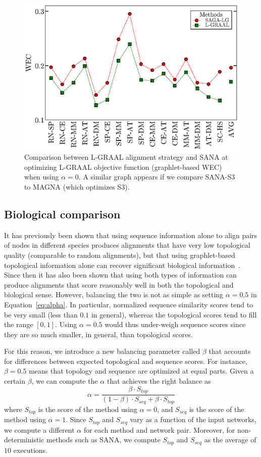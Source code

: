 \documentclass{bioinfo}
\begin{document}
\begin{figure}
\centering
\includegraphics[width=0.99\linewidth]{lgraalobjfuncomparison_bw.eps}
\caption{Comparison between L-GRAAL alignment strategy and SANA at optimizing L-GRAAL objective function (graphlet-based WEC) when using $\alpha=0$. A similar graph appears if we compare SANA-S3 to MAGNA (which optimizes S3).}
\label{fig:lgraalobjfuncomparison}
\end{figure}

\subsection{Biological comparison}\label{bio}

It has previously been shown that using sequence information alone to align pairs of nodes in different species produces alignments that have very low topological quality (comparable to random alignments), but that using graphlet-based topological information alone can recover significant biological information~\citep{GRAAL}. Since then it has also been shown that using both types of information can produce alignments that score reasonably well in both the topological and biological sense. However, balancing the two is not as simple as setting $\alpha=0.5$ in Equation~\ref{eq:alpha}. In particular, normalized sequence similarity scores tend to be very small (less than $0.1$ in general), whereas the topological scores tend to fill the range $[0,1]$. Using $\alpha=0.5$ would thus under-weigh sequence scores since they are so much smaller, in general, than topological scores.

For this reason, we introduce a new balancing parameter called $\beta$ that accounts for differences between expected topological and sequence scores. For instance, $\beta=0.5$ means that topology and sequence are optimized at equal parts. Given a certain $\beta$, we can compute the $\alpha$ that achieves the right balance as
$$\alpha = \frac{\beta\cdot S_{top}}{(1-\beta)\cdot S_{seq}+\beta\cdot S_{top}}$$
where $S_{top}$ is the score of the method using $\alpha=0$, and $S_{seq}$ is the score of the method using $\alpha=1$. Since $S_{top}$ and $S_{seq}$ vary as a function of the input networks, we compute a different $\alpha$ for each method and network pair. Moreover, for non-deterministic methods such as SANA, we compute $S_{top}$ and $S_{seq}$ as the average of $10$ executions.
\end{document}
